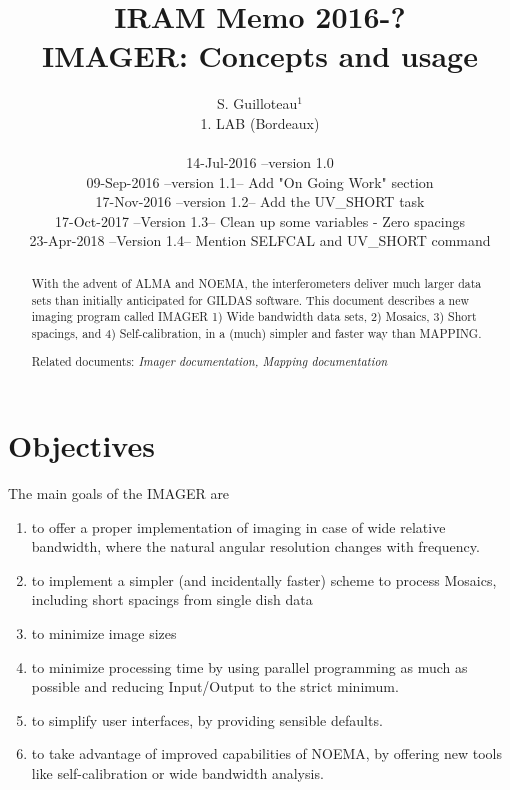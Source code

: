 \documentclass[11pt]{article}
\title{IRAM Memo 2016-?\\[3\bigskipamount]
  IMAGER: Concepts and usage}
\author{S. Guilloteau$^{1}$\\
 \vspace{0.3cm}
  1. LAB (Bordeaux)\\
 \vspace{0.5cm}
{\begin{tabular}{lll}
  14-Jul-2016  -- &  version 1.0 & \\
  09-Sep-2016  --  & version 1.1  & -- Add "On Going Work" section \\
  17-Nov-2016  --  & version 1.2  & -- Add the UV\_SHORT task \\
  17-Oct-2017  --  & Version 1.3  & -- Clean up some variables - Zero spacings \\
  23-Apr-2018  --  & Version 1.4  & -- Mention SELFCAL and UV\_SHORT command
 \end{tabular}}
 }
\begin{document}
\maketitle

%

\begin{abstract}
  With the advent of ALMA and NOEMA, the interferometers deliver much
  larger data sets than initially anticipated for GILDAS software.
  This document describes a new imaging program called IMAGER
  1) Wide bandwidth data sets, 2) Mosaics,  3) Short spacings,
  and 4) Self-calibration, in a (much) simpler and faster way than MAPPING.

  Related documents: \emph{Imager documentation, Mapping documentation}
\end{abstract}

\newpage
\tableofcontents{}

\section{Objectives}

The main goals of the IMAGER are
\begin{enumerate}
\item to offer a proper implementation of imaging in case of
wide relative bandwidth, where the natural angular resolution
changes with frequency.
\item to implement a simpler (and incidentally faster) scheme to process Mosaics,
including short spacings from single dish data
\item to minimize image sizes 
\item to minimize processing time by using parallel
programming as much as possible and reducing Input/Output to the strict minimum.
\item to simplify user interfaces, by providing sensible defaults.
\item to take advantage of improved capabilities of NOEMA, by offering new
tools like self-calibration or wide bandwidth analysis.
\end{enumerate}
\end{document}
